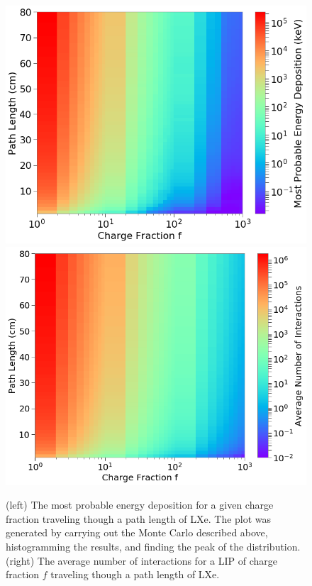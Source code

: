  \begin{figure}[htbp]
\begin{center}
\includegraphics[width=\halffig]{figures/lips/dEprob.png}
\includegraphics[width=\halffig]{figures/lips/avg_hits.png}
\caption{(left) The most probable energy deposition for a given charge fraction traveling though a path length of \acs{LXe}. The plot was generated by carrying out the Monte Carlo described above, histogramming the results, and finding the peak of the distribution. (right) The average number of interactions for a \acs{LIP} of charge fraction $f$ traveling though a path length of \acs{LXe}. }
\label{fig:straggling_summary}
\end{center}
\end{figure}

